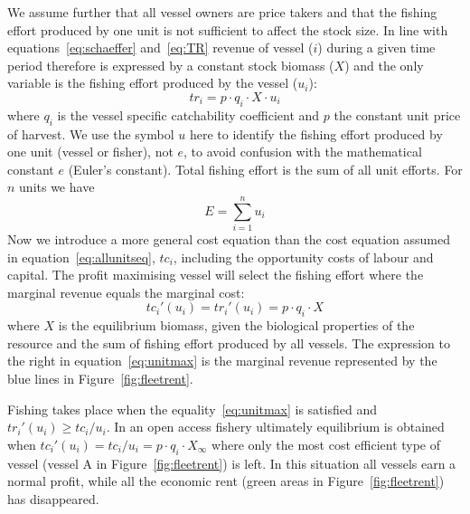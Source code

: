 \documentclass[11pt,fleqn]{book} %
\begin{document}
We assume further that all vessel owners are price takers and that the fishing effort produced by one unit is not sufficient to affect the stock size. In line with equations~\ref{eq:schaeffer} and~\ref{eq:TR} revenue of vessel ($i$) during a given time period therefore is expressed by a constant stock biomass ($X$) and the only variable is the fishing effort produced by the vessel ($u_i$):
\begin{equation} 
\label{eq:unitrevenue}
tr_i = p \cdot q_i \cdot X \cdot u_i
\end{equation} 
where $q_i$ is the vessel specific catchability coefficient and $p$ the constant unit price of harvest. We use the symbol $u$ here to identify the fishing effort produced by one unit (vessel or fisher), not $e$, to avoid confusion with the mathematical constant $e$ (Euler's constant). Total fishing effort is the sum of all unit efforts. For $n$ units we have
\begin{equation} 
\label{eq:sumofunits}
E = \sum_{i=1}^n u_i
\end{equation}
Now we introduce a more general cost equation than the cost equation assumed in equation~\ref{eq:allunitseq}, $tc_i$, including the opportunity costs of labour and capital. The profit maximising vessel will select the fishing effort where the marginal revenue equals the marginal cost:
\begin{equation} 
\label{eq:unitmax}
tc_i'(u_i) = tr_i'(u_i) = p \cdot q_i \cdot X
\end{equation} 
where $X$ is the equilibrium biomass, given the biological properties of the resource and the sum of fishing effort produced by all vessels. The expression to the right in equation~\ref{eq:unitmax} is the marginal revenue represented by the blue lines in Figure~\ref{fig:fleetrent}.

Fishing takes place when the equality~\ref{eq:unitmax} is satisfied and $tr_i'(u_i) \geq tc_i/u_i$. In an open access fishery ultimately equilibrium is obtained when $tc_i'(u_i) = tc_i/u_i = p \cdot q_i \cdot X_\infty$ where only the most cost efficient type of vessel (vessel A in Figure~\ref{fig:fleetrent}) is left. In this situation all vessels earn a normal profit, while all the economic rent (green areas in Figure~\ref{fig:fleetrent}) has disappeared.

\begin{figure}[!htb]
\end{figure}
\end{document}
